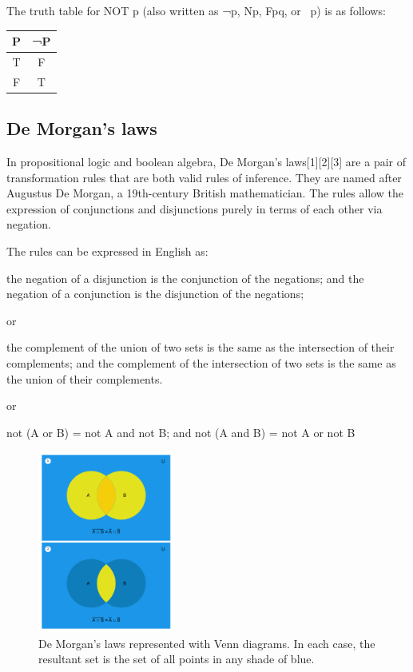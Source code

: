 \documentclass{article}
\begin{document}
The truth table for NOT p (also written as ¬p, Np, Fpq, or ~p) is as follows: 
 \begin{center}
\begin{tabular}{ |c|c|} 
\hline
P&¬P \\ 
\hline
T&F \\ 
\hline
F&T \\ 
\hline
\end{tabular}
\end{center}
\subsection{De Morgan's laws}
In propositional logic and boolean algebra, De Morgan's laws[1][2][3] are a pair of transformation rules that are both valid rules of inference. They are named after Augustus De Morgan, a 19th-century British mathematician. The rules allow the expression of conjunctions and disjunctions purely in terms of each other via negation.

The rules can be expressed in English as:

    the negation of a disjunction is the conjunction of the negations; and
    the negation of a conjunction is the disjunction of the negations;

or

    the complement of the union of two sets is the same as the intersection of their complements; and
    the complement of the intersection of two sets is the same as the union of their complements.

or

    not (A or B) = not A and not B; and
    not (A and B) = not A or not B
\begin{figure}[h]
\includegraphics[width=0.4\textwidth]{ssm.png}
\caption{De Morgan's laws represented with Venn diagrams. In each case, the resultant set is the set of all points in any shade of blue.}
\end{figure}
\end{document}
